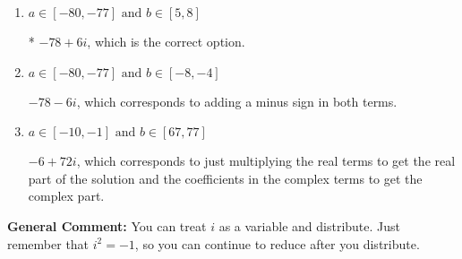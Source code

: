 \documentclass{extbook}[14pt]
\begin{document}
\begin{enumerate}
{\begin{enumerate}[label=\Alph*.]
 $66 - 42 i$, which corresponds to adding a minus sign in the second term.
\item \( a \in [-80, -77] \text{ and } b \in [5, 8] \)

* $-78 + 6 i$, which is the correct option.
\item \( a \in [-80, -77] \text{ and } b \in [-8, -4] \)

 $-78 - 6 i$, which corresponds to adding a minus sign in both terms.
\item \( a \in [-10, -1] \text{ and } b \in [67, 77] \)

 $-6 + 72 i$, which corresponds to just multiplying the real terms to get the real part of the solution and the coefficients in the complex terms to get the complex part.
\end{enumerate}

\textbf{General Comment:} You can treat $i$ as a variable and distribute. Just remember that $i^2=-1$, so you can continue to reduce after you distribute.
}
\end{enumerate}
\end{document}
